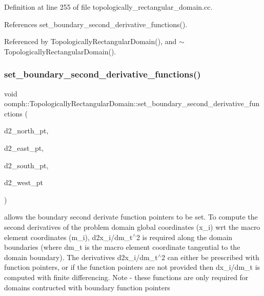 Definition at line 255 of file topologically\+\_\+rectangular\+\_\+domain.\+cc.



References set\+\_\+boundary\+\_\+second\+\_\+derivative\+\_\+functions().



Referenced by Topologically\+Rectangular\+Domain(), and $\sim$\+Topologically\+Rectangular\+Domain().

\mbox{\label{classoomph_1_1TopologicallyRectangularDomain_a69d21da2d4dff225943aab99fb4f1f10}} 
\subsubsection{\texorpdfstring{set\+\_\+boundary\+\_\+second\+\_\+derivative\+\_\+functions()}{set\_boundary\_second\_derivative\_functions()}}
{\footnotesize\ttfamily void oomph\+::\+Topologically\+Rectangular\+Domain\+::set\+\_\+boundary\+\_\+second\+\_\+derivative\+\_\+functions (\begin{DoxyParamCaption}\item[{\hyperlink{classoomph_1_1TopologicallyRectangularDomain_a8b2e24f5500d86c93aef509c5410e7cc}{Boundary\+Fct\+Pt}}]{d2\+\_\+north\+\_\+pt,  }\item[{\hyperlink{classoomph_1_1TopologicallyRectangularDomain_a8b2e24f5500d86c93aef509c5410e7cc}{Boundary\+Fct\+Pt}}]{d2\+\_\+east\+\_\+pt,  }\item[{\hyperlink{classoomph_1_1TopologicallyRectangularDomain_a8b2e24f5500d86c93aef509c5410e7cc}{Boundary\+Fct\+Pt}}]{d2\+\_\+south\+\_\+pt,  }\item[{\hyperlink{classoomph_1_1TopologicallyRectangularDomain_a8b2e24f5500d86c93aef509c5410e7cc}{Boundary\+Fct\+Pt}}]{d2\+\_\+west\+\_\+pt }\end{DoxyParamCaption})}



allows the boundary second derivate function pointers to be set. To compute the second derivatives of the problem domain global coordinates (x\+\_\+i) wrt the macro element coordinates (m\+\_\+i), d2x\+\_\+i/dm\+\_\+t$^\wedge$2 is required along the domain boundaries (where dm\+\_\+t is the macro element coordinate tangential to the domain boundary). The derivatives d2x\+\_\+i/dm\+\_\+t$^\wedge$2 can either be prescribed with function pointers, or if the function pointers are not provided then dx\+\_\+i/dm\+\_\+t is computed with finite differencing. Note -\/ these functions are only required for domains contructed with boundary function pointers 



